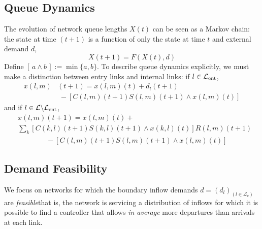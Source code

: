 \subsection*{Queue Dynamics}
The evolution of network queue lengths $X(t)$ can be seen as a Markov chain: the state at time $(t+1)$ is a function of only the state at time $t$ and external demand $d$,
\begin{equation}
X(t+1) = F(X(t),d)
\end{equation}
Define $[\,a \wedge b\,]:=\min\{a,b\}$. To describe queue dynamics explicitly, we must make a distinction between entry links and internal links: if $l\in \mathcal{L}_{\text{ent}}$,
\begin{align} \label{entrydynamics}
x(l,m)&(t+1) = x(l,m)(t) + d_{l}(t+1) \\ &  \;  - [C(l,m)(t+1)S(l,m)(t+1) \wedge x(l,m)(t)] \nonumber 
\end{align}
and if $l\in \mathcal{L}\backslash\mathcal{L}_{\text{ent}}$,
\begin{align}\label{internaldynamics}
&x(l,m)(t+1) = x(l,m)(t) + \\ \nonumber
& \sum_{k}[C(k,l)(t+1)S(k,l)(t+1) \wedge x(k,l)(t)]R(l,m)(t+1) \\ \nonumber 
&\qquad  \qquad- [C(l,m)(t+1)S(l,m)(t+1) \wedge x(l,m)(t)] 
\end{align} 

\vspace{-.5em}
\subsection*{Demand Feasibility}
We focus on networks for which the boundary inflow demands $d = (d_{l})_{(l\in \mathcal{L}_{e})}$ are \emph{feasible}\textemdash that is, the network is servicing a distribution of inflows for which it is possible to find a controller that allows \textit{in average} more departures than arrivals at each link. 

